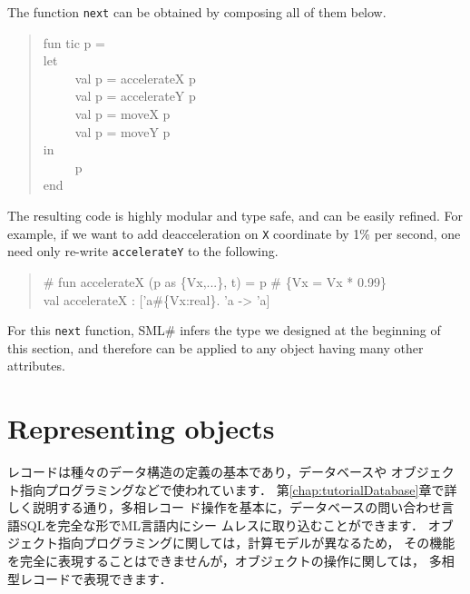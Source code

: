 \documentclass{jbook}
\newcommand{\txt}[2]{#2}
\newcommand{\smlsharp}{SML\#}
\newcommand{\myem}{\ \ \ \ \  }
\begin{document}
	The function {\tt next} can be obtained by composing all of them
below.
\begin{tt}\begin{quote}
fun tic p =\\
let\\
\myem  val p = accelerateX p\\
\myem  val p = accelerateY p\\
\myem  val p = moveX p\\
\myem  val p = moveY p\\
in\\
\myem  p\\
end
\end{quote}\end{tt}
	The resulting code is highly modular and type safe, and can be
easily refined.
	For example, if we want to add deacceleration on {\tt X}
coordinate by 1\% per second, one need only re-write {\tt accelerateY}
to the following.
\begin{tt}\begin{quote}
\# fun accelerateX (p as \{Vx,...\}, t) = p \# \{Vx = Vx * 0.99\}\\
val accelerateX : ['a\#\{Vx:real\}. 'a -> 'a]\\
\end{quote}\end{tt}

	For this {\tt next} function, \smlsharp{} infers the type we 
designed at the beginning of this section, and therefore can be applied
to any object having many other attributes.
\fi%


\section{\txt{オブジェクトの表現}{Representing objects}}
\label{sec:extensionObject}

\ifx\jp%
	レコードは種々のデータ構造の定義の基本であり，データベースや
オブジェクト指向プログラミングなどで使われています．
	第\ref{chap:tutorialDatabase}章で詳しく説明する通り，多相レコー
ド操作を基本に，データベースの問い合わせ言語SQLを完全な形でML言語内にシー
ムレスに取り込むことができます．
	オブジェクト指向プログラミングに関しては，計算モデルが異なるため，
その機能を完全に表現することはできませんが，オブジェクトの操作に関しては，
多相型レコードで表現できます．
	
\end{document}
